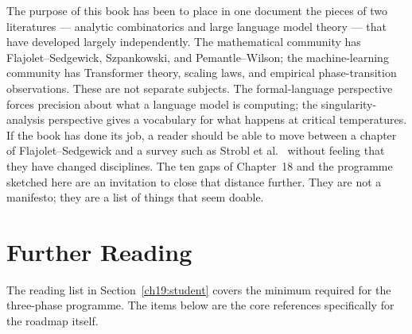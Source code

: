 The purpose of this book has been to place in one document the pieces
of two literatures --- analytic combinatorics and large language model
theory --- that have developed largely independently.  The mathematical
community has Flajolet--Sedgewick, Szpankowski, and Pemantle--Wilson;
the machine-learning community has Transformer theory, scaling laws,
and empirical phase-transition observations.  These are not separate
subjects.  The formal-language perspective forces precision about what
a language model is computing; the singularity-analysis perspective
gives a vocabulary for what happens at critical temperatures.  If the
book has done its job, a reader should be able to move between a
chapter of Flajolet--Sedgewick and a survey such as Strobl et
al.~\cite{StroblEtAl2024} without feeling that they have changed
disciplines.  The ten gaps of Chapter~18 and the programme sketched
here are an invitation to close that distance further.  They are not
a manifesto; they are a list of things that seem doable.

\section*{Further Reading}
\label{ch19:furtherreading}

The reading list in Section~\ref{ch19:student} covers the minimum
required for the three-phase programme.  The items below are the core
references specifically for the roadmap itself.

